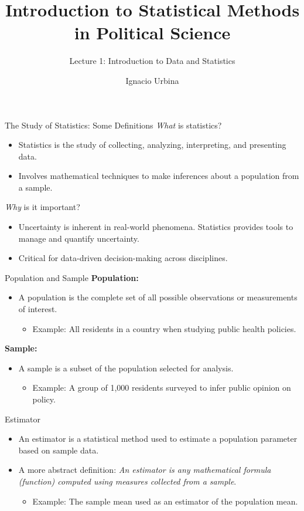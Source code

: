 \documentclass[handout]{beamer} %
\title{Introduction to Statistical Methods in Political Science}
\subtitle{Lecture 1: Introduction to Data and Statistics}
\author{Ignacio Urbina}
\date{}
\begin{document}
\frame{\titlepage}


\begin{frame}{The Study of Statistics: Some Definitions}
\emph{What} is statistics?
    \begin{itemize}
        \item Statistics is the study of collecting, analyzing, interpreting, and presenting data.
        \item Involves mathematical techniques to make inferences about a population from a sample.
    \end{itemize}

\emph{Why} is it important?
    \begin{itemize}
        \item Uncertainty is inherent in real-world phenomena. Statistics provides tools to manage and quantify uncertainty.
        \item Critical for data-driven decision-making across disciplines.
    \end{itemize}
\end{frame}


\begin{frame}{Population and Sample}
\textbf{Population:}
    \begin{itemize}
        \item A population is the complete set of all possible observations or measurements of interest.
            \begin{itemize}
                \item Example: All residents in a country when studying public health policies.
            \end{itemize}
    \end{itemize}
\textbf{Sample:}
    \begin{itemize}
        \item A sample is a subset of the population selected for analysis.
            \begin{itemize}
                \item Example: A group of 1,000 residents surveyed to infer public opinion on policy.
            \end{itemize}
    \end{itemize}
\end{frame}


\begin{frame}{Estimator}
    \begin{itemize}
        \item An estimator is a statistical method used to estimate a population parameter based on sample data.
        \item A more abstract definition: \emph{An estimator is any mathematical formula (function) computed using measures collected from a sample}.
            \begin{itemize}
                \item Example: The sample mean used as an estimator of the population mean.
            \end{itemize}
    \end{itemize}
\end{frame}
\end{document}

